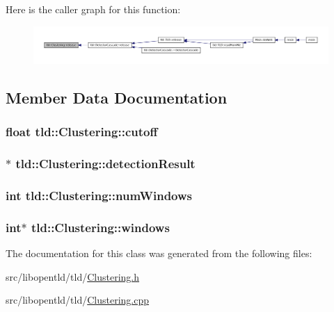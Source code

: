 Here is the caller graph for this function:
\nopagebreak
\begin{figure}[H]
\begin{center}
\leavevmode
\includegraphics[width=400pt]{classtld_1_1_clustering_a2dbde4a94a483e8befe4b710445941bf_icgraph}
\end{center}
\end{figure}




\subsection{Member Data Documentation}
\hypertarget{classtld_1_1_clustering_ae5fcb2d589b404b081dad28977467707}{
\subsubsection[{cutoff}]{\setlength{\rightskip}{0pt plus 5cm}float {\bf tld::Clustering::cutoff}}}
\label{classtld_1_1_clustering_ae5fcb2d589b404b081dad28977467707}
\hypertarget{classtld_1_1_clustering_abfc41de1f95b5c019676aa5f42d9e960}{
\subsubsection[{detectionResult}]{$\ast$ {\bf tld::Clustering::detectionResult}}}
\label{classtld_1_1_clustering_abfc41de1f95b5c019676aa5f42d9e960}
\hypertarget{classtld_1_1_clustering_a25b3b82795ea06758b6a321f856f004b}{
\subsubsection[{numWindows}]{\setlength{\rightskip}{0pt plus 5cm}int {\bf tld::Clustering::numWindows}}}
\label{classtld_1_1_clustering_a25b3b82795ea06758b6a321f856f004b}
\hypertarget{classtld_1_1_clustering_acd1251895c2999f2041b50142cf81dda}{
\subsubsection[{windows}]{\setlength{\rightskip}{0pt plus 5cm}int$\ast$ {\bf tld::Clustering::windows}}}
\label{classtld_1_1_clustering_acd1251895c2999f2041b50142cf81dda}


The documentation for this class was generated from the following files:\begin{DoxyCompactItemize}
\item 
src/libopentld/tld/\hyperlink{_clustering_8h}{Clustering.h}\item 
src/libopentld/tld/\hyperlink{_clustering_8cpp}{Clustering.cpp}\end{DoxyCompactItemize}
